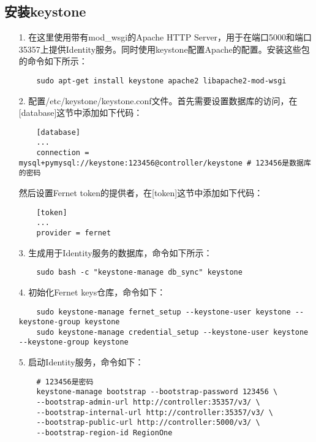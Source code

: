 \documentclass[a4paper,left=2.5cm,right=2.5cm,11pt]{article}
\begin{document}
\subsection{安装keystone}
	\begin{itemize}
		\item[1.] 在这里使用带有mod\_wsgi的Apache HTTP Server，用于在端口5000和端口35357上提供Identity服务。同时使用keystone配置Apache的配置。安装这些包的命令如下所示：
		\begin{lstlisting}
	sudo apt-get install keystone apache2 libapache2-mod-wsgi
		\end{lstlisting}

		\item[2.] 配置/etc/keystone/keystone.conf文件。首先需要设置数据库的访问，在[database]这节中添加如下代码：
		\begin{lstlisting}
	[database]
	...
	connection = mysql+pymysql://keystone:123456@controller/keystone # 123456是数据库的密码
		\end{lstlisting}

		然后设置Fernet token的提供者，在[token]这节中添加如下代码：
		\begin{lstlisting}
	[token]
	...
	provider = fernet
		\end{lstlisting}

		\item[3.] 生成用于Identity服务的数据库，命令如下所示：
		\begin{lstlisting}
	sudo bash -c "keystone-manage db_sync" keystone
		\end{lstlisting}

		\item[4.] 初始化Fernet keys仓库，命令如下：
		\begin{lstlisting}
	sudo keystone-manage fernet_setup --keystone-user keystone --keystone-group keystone
	sudo keystone-manage credential_setup --keystone-user keystone --keystone-group keystone
		\end{lstlisting}

		\item[5.] 启动Identity服务，命令如下：
		\begin{lstlisting}
	# 123456是密码
	keystone-manage bootstrap --bootstrap-password 123456 \
	--bootstrap-admin-url http://controller:35357/v3/ \
	--bootstrap-internal-url http://controller:35357/v3/ \
	--bootstrap-public-url http://controller:5000/v3/ \
	--bootstrap-region-id RegionOne
		\end{lstlisting}
	\end{itemize}
\end{document}
